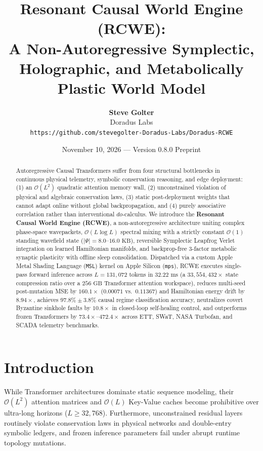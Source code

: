 \documentclass[11pt,twocolumn]{article}
\title{\textbf{Resonant Causal World Engine (RCWE):\\A Non-Autoregressive Symplectic, Holographic, and Metabolically Plastic World Model}}
\author{
  \textbf{Steve Golter} \\
  Doradus Labs \\
  \texttt{https://github.com/stevegolter-Doradus-Labs/Doradus-RCWE}
}
\date{November 10, 2026 --- Version 0.8.0 Preprint}
\begin{document}
\maketitle

\begin{abstract}
Autoregressive Causal Transformers suffer from four structural bottlenecks in continuous physical telemetry, symbolic conservation reasoning, and edge deployment: (1) an $\mathcal{O}(L^2)$ quadratic attention memory wall, (2) unconstrained violation of physical and algebraic conservation laws, (3) static post-deployment weights that cannot adapt online without global backpropagation, and (4) purely associative correlation rather than interventional $do$-calculus. We introduce the \textbf{Resonant Causal World Engine (RCWE)}, a non-autoregressive architecture uniting complex phase-space wavepackets, $\mathcal{O}(L \log L)$ spectral mixing with a strictly constant $\mathcal{O}(1)$ standing wavefield state ($|\Psi| = 8.0\text{--}16.0\text{ KB}$), reversible Symplectic Leapfrog Verlet integration on learned Hamiltonian manifolds, and backprop-free 3-factor metabolic synaptic plasticity with offline sleep consolidation. Dispatched via a custom Apple Metal Shading Language (\texttt{MSL}) kernel on Apple Silicon (\texttt{mps}), RCWE executes single-pass forward inference across $L = 131,072$ tokens in $32.22\text{ ms}$ (a $33,554,432\times$ state compression ratio over a $256\text{ GB}$ Transformer attention workspace), reduces multi-seed post-mutation MSE by $160.1\times$ ($0.00071$ vs.\ $0.11367$) and Hamiltonian energy drift by $8.94\times$, achieves $97.8\% \pm 3.8\%$ causal regime classification accuracy, neutralizes covert Byzantine sinkhole faults by $10.8\times$ in closed-loop self-healing control, and outperforms frozen Transformers by $73.4\times\text{--}472.4\times$ across ETT, SWaT, NASA Turbofan, and SCADA telemetry benchmarks.
\end{abstract}

\section{Introduction}
While Transformer architectures dominate static sequence modeling, their $\mathcal{O}(L^2)$ attention matrices and $\mathcal{O}(L)$ Key-Value caches become prohibitive over ultra-long horizons ($L \ge 32,768$). Furthermore, unconstrained residual layers routinely violate conservation laws in physical networks and double-entry symbolic ledgers, and frozen inference parameters fail under abrupt runtime topology mutations.
\end{document}
